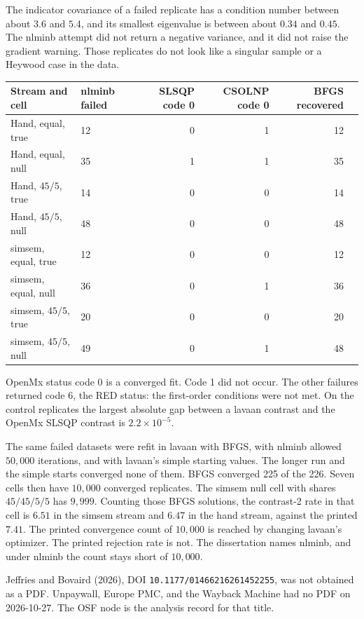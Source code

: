 \documentclass[11pt]{article}
\begin{document}
The indicator covariance of a failed replicate has a condition number
between about \(3.6\) and \(5.4\), and its smallest eigenvalue is
between about \(0.34\) and \(0.45\). The nlminb attempt did not return
a negative variance, and it did not raise the gradient warning.
Those replicates do not look like a singular sample or a Heywood case
in the data.

\begin{center}
\footnotesize
\begin{tabular}{@{}llrrrr@{}}
\toprule
Stream and cell & nlminb failed & SLSQP code 0 & CSOLNP code 0 & BFGS recovered \\
\midrule
Hand, equal, true & 12 & 0 & 1 & 12 \\
Hand, equal, null & 35 & 1 & 1 & 35 \\
Hand, \(45/5\), true & 14 & 0 & 0 & 14 \\
Hand, \(45/5\), null & 48 & 0 & 0 & 48 \\
simsem, equal, true & 12 & 0 & 0 & 12 \\
simsem, equal, null & 36 & 0 & 1 & 36 \\
simsem, \(45/5\), true & 20 & 0 & 0 & 20 \\
simsem, \(45/5\), null & 49 & 0 & 1 & 48 \\
\bottomrule
\end{tabular}
\end{center}

OpenMx status code 0 is a converged fit. Code 1 did not occur.
The other failures returned code 6, the RED status: the first-order
conditions were not met. On the control replicates the largest absolute
gap between a lavaan contrast and the OpenMx SLSQP contrast is
\(2.2\times 10^{-5}\).

The same failed datasets were refit in lavaan with BFGS, with nlminb
allowed \(50{,}000\) iterations, and with lavaan's simple starting
values. The longer run and the simple starts converged none of them.
BFGS converged 225 of the 226. Seven cells then have \(10{,}000\)
converged replicates. The simsem null cell with shares \(45/45/5/5\)
has \(9{,}999\). Counting those BFGS solutions, the contrast-2 rate in
that cell is \(6.51\) in the simsem stream and \(6.47\) in the hand
stream, against the printed \(7.41\). The printed convergence count of
\(10{,}000\) is reached by changing lavaan's optimizer. The printed
rejection rate is not. The dissertation names nlminb, and under nlminb
the count stays short of \(10{,}000\).

Jeffries and Bovaird (2026), DOI \texttt{10.1177/01466216261452255},
was not obtained as a PDF. Unpaywall, Europe PMC, and the Wayback
Machine had no PDF on 2026-10-27. The OSF node is the analysis record
for that title.
\end{document}
